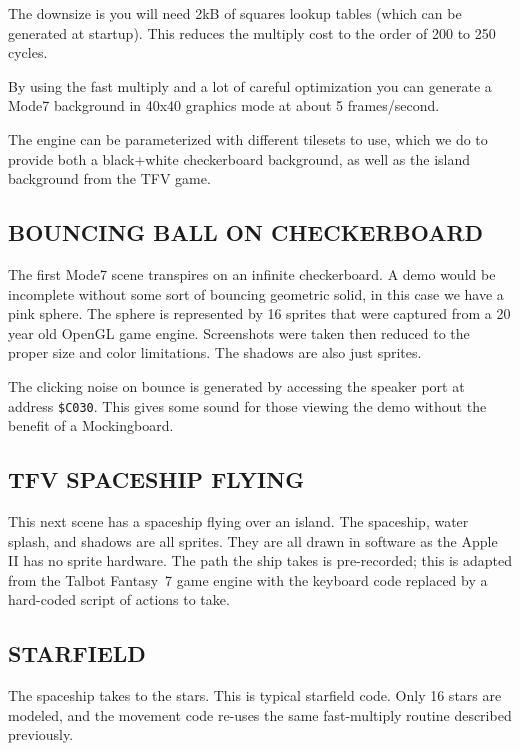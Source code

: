 \documentclass[twocolumn]{article}
\begin{document}
  The downsize is you will need 2kB of squares lookup tables (which can
  be generated at startup).  This reduces the multiply cost to the order
  of 200 to 250 cycles.

  By using the fast multiply and a lot of careful optimization you can
  generate a Mode7 background in 40x40 graphics mode at about 5 frames/second.

  The engine can be parameterized with different tilesets to use, which we
  do to provide both a black+white checkerboard background, as well as the
  island background from the TFV game.

\subsection{BOUNCING BALL ON CHECKERBOARD}

The first Mode7 scene transpires on an infinite checkerboard.
A demo would be incomplete without some sort of bouncing geometric solid,
in this case we have a pink sphere.
The sphere is represented by 16 sprites that were captured from
a 20 year old OpenGL game engine.
Screenshots were taken then reduced to the proper size and color
limitations.
The shadows are also just sprites.

The clicking noise on bounce is generated by accessing the speaker port
at address {\tt \$C030}.
This gives some sound for those viewing the demo without the benefit
of a Mockingboard.


\subsection{TFV SPACESHIP FLYING}

This next scene has a spaceship flying over an island.
The spaceship, water splash, and shadows are all sprites.
They are all drawn in software as the Apple II has no sprite hardware.
The path the ship takes is pre-recorded; this is adapted from the
Talbot Fantasy~7 game engine with the keyboard code replaced by a hard-coded
script of actions to take.

\subsection{STARFIELD}

The spaceship takes to the stars.
This is typical starfield code.
Only 16 stars are modeled, and the movement code re-uses the 
same fast-multiply routine described previously.
\end{document}
